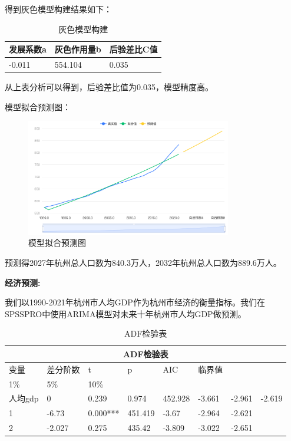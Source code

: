 \documentclass[12pt, a4paper, oneside]{ctexart}
\begin{document}
得到灰色模型构建结果如下：

\begin{table}[H]
  \centering
  \begin{tabularx}{0.9\textwidth}{XXX}
  \toprule
  发展系数a & 灰色作用量b & 后验差比C值 \\
  \midrule
  -0.011 & 554.104 & 0.035 \\
  \bottomrule
  \end{tabularx}
  \caption{灰色模型构建}
  \label{tab:grey}
\end{table}

从上表分析可以得到，后验差比值为0.035，模型精度高。

模型拟合预测图：
\begin{figure}[H]
  \centering
  \includegraphics[width=0.8\textwidth]{pic/模型拟合预测图.png}
  \caption{模型拟合预测图}
  \label{fig:模型拟合预测图}
\end{figure}



预测得2027年杭州总人口数为840.3万人，2032年杭州总人口数为889.6万人。

\textbf{经济预测:}

我们以1990-2021年杭州市人均GDP作为杭州市经济的衡量指标。我们在SPSSPRO中使用ARIMA模型对未来十年杭州市人均GDP做预测。

\begin{table}[H]
  \centering
  \begin{tabularx}{0.9\textwidth}{llXXXXXX}
  \toprule
  \multicolumn{8}{c}{ADF检验表}\\
  \midrule
  变量 & 差分阶数 & t & p & AIC & 临界值 & & \\
  1\% & 5\% & 10\% & & & & & \\
  人均gdp & 0 & 0.239 & 0.974 & 452.928 & -3.661 & -2.961 & -2.619 \\
  1 & -6.73 & 0.000*** & 451.419 & -3.67 & -2.964 & -2.621 & \\
  2 & -2.027 & 0.275 & 435.42 & -3.809 & -3.022 & -2.651 & \\
  \bottomrule
  \end{tabularx}
  \caption{ADF检验表}
  \label{tab:ADF}
\end{table}
\end{document}
